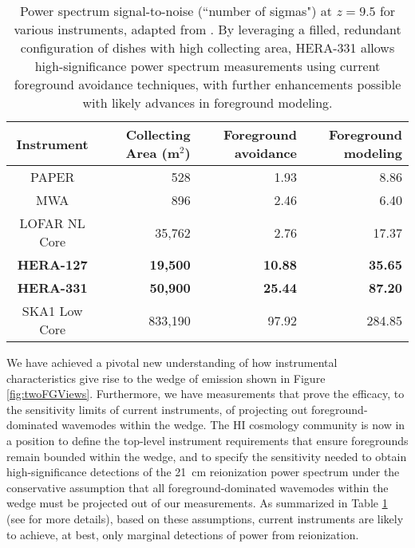 \documentclass[preprint]{aastex}
\newcommand{\Mycitet}[1]{{\bf \citet{#1}}}
\newcommand{\Mycitealt}[1]{{\bf \citealt{#1}}}
\newcommand{\Caption}[4]{\vspace{#1}\renewcommand{\baselinestretch}{#2}\caption{#4}\vspace{#3}}
\begin{document}
\begin{table}[t]
\small
 \centering
 \begin{tabular}{c||r||r|r} 
\hline
Instrument & Collecting Area (m$^2$) & Foreground avoidance & Foreground modeling \\
\hline
PAPER & 528 & 1.93 & 8.86 \\
MWA & 896 & 2.46 & 6.40 \\
LOFAR NL Core & 35,762 & 2.76 & 17.37 \\
\textbf{HERA-127} & \textbf{19,500} & \textbf{10.88} & \textbf{35.65} \\
\textbf{HERA-331} & \textbf{50,900} & \textbf{25.44} & \textbf{87.20} \\
SKA1 Low Core & 833,190 & 97.92 & 284.85 \\
\end{tabular}
\Caption{-0.1in}{0.99}{-0.1in}{Power spectrum signal-to-noise (``number of sigmas") at $z=9.5$ for various instruments, adapted from \Mycitet{pober_et_al2014}.  By leveraging a filled, redundant configuration of dishes with high collecting area, HERA-331 allows high-significance power spectrum measurements using current foreground avoidance techniques, with further enhancements possible with likely advances in foreground modeling.}
\label{tab:signif}
\end{table}

We have achieved a
pivotal new understanding of how instrumental characteristics give rise to the
wedge of emission shown in Figure \ref{fig:twoFGViews}.  Furthermore, we have
measurements that prove the efficacy, to the sensitivity limits of current
instruments, of projecting out foreground-dominated wavemodes within the
wedge.  The HI cosmology community is now in a position to define
the top-level instrument requirements that ensure foregrounds remain bounded
within the wedge, and to specify the sensitivity needed to obtain
high-significance detections of the 21~cm reionization power spectrum under the
conservative assumption that all foreground-dominated wavemodes within the
wedge must be projected out of our measurements.
As summarized in Table \ref{tab:signif} (see \Mycitealt{pober_et_al2014} for more details),
based on these assumptions, current instruments are likely to achieve,
at best, only marginal detections of power from reionization.
\end{document}
